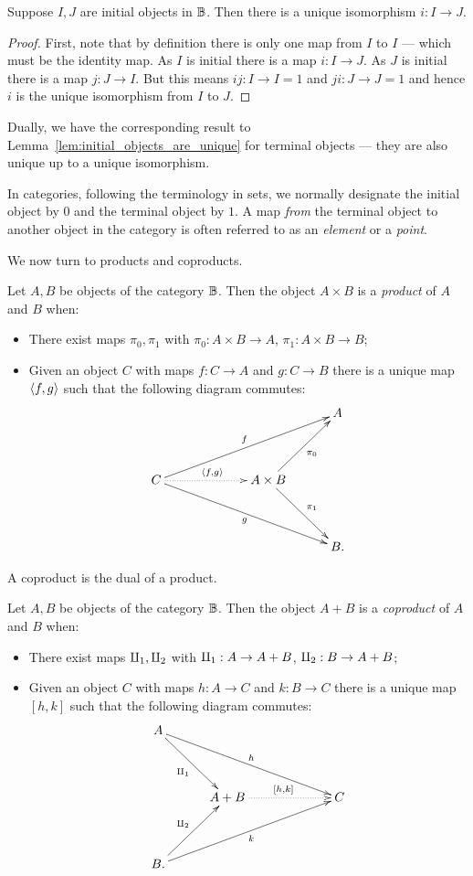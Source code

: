 \begin{lemma}\label{lem:initial_objects_are_unique}
  Suppose $I,J$ are initial objects in $\mathbb{B}$. Then there is a unique isomorphism $i:I \to J$.
\end{lemma}
\begin{proof}
  First, note that by definition there is only one map from $I$ to $I$ --- which must be the
  identity map. As $I$ is initial there is a map $i: I \to J$. As $J$ is initial there is a map
  $j:J \to I$. But this means $i j : I \to I = 1$ and $j i : J \to J = 1$ and hence $i$ is the
  unique isomorphism from $I$ to $J$.
\end{proof}

Dually, we have the corresponding result to Lemma~\ref{lem:initial_objects_are_unique} for terminal
objects --- they are also unique up to a unique isomorphism.

In categories, following the terminology in sets, we normally designate the initial object by $0$
and the terminal object by $1$.
A map \emph{from} the terminal object to another object in the category is often referred to as an
\emph{element} or a \emph{point}.

We now turn to products and coproducts.

\begin{definition}\label{def:categorical_product}
  Let $A,B$ be objects of the category $\mathbb{B}$. Then the object $A \times B$ is a \emph{product} of
  $A$ and $B$ when:
  \begin{itemize}
    \item There exist maps $\pi_0, \pi_1$ with $\pi_0:A\times B \to A$, $\pi_1:A\times B \to B$;
    \item Given an object $C$ with maps $f:C\to A$ and $g:C \to B$ there is a unique map
    $\langle f,g\rangle$ such that the following diagram commutes:
    \[
      \xymatrix@C+5pt@R+15pt{
        &&&A\\
        C\ar[urrr]^{f} \ar[drrr]_{g}\ar@{.>}[rr]^{\<f,g\>} & &A\times B \ar[ur]_{\pi_0}\ar[dr]^{\pi_1}\\
        &&&B.
      }
    \]
  \end{itemize}

\end{definition}

A coproduct is the dual of a product.

\begin{definition}\label{def:categorical_coproduct}
  Let $A,B$ be objects of the category $\mathbb{B}$. Then the object $A + B$ is a \emph{coproduct} of
  $A$ and $B$ when:
  \begin{itemize}
    \item There exist maps $\amalg_{1}, \amalg_{2}$ with $\amalg_{1}:A \to A + B$, $\amalg_{2}:B \to A+ B$;
    \item Given an object $C$ with maps $h:A\to C$ and $k:B \to C$ there is a unique map
    $[h,k]$ such that the following diagram commutes:
    \[
      \xymatrix@C+5pt@R+15pt{
        A \ar[drrr]^h \ar[dr]_{\cpa} \\
        &A +B \ar@{.>}[rr]^{[h,k]} && C\\
        B. \ar[urrr]_k \ar[ur]^{\cpb}
      }
    \]
  \end{itemize}
\end{definition}

